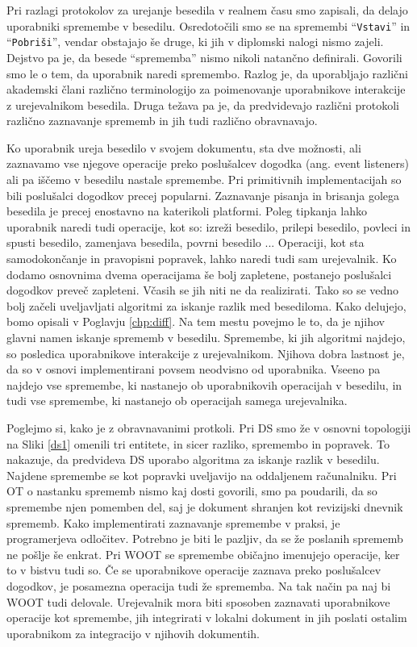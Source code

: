 \documentclass[a4paper, 12pt, twoside]{book}
\begin{document}
Pri razlagi protokolov za urejanje besedila v realnem času smo zapisali, da delajo uporabniki spremembe v besedilu. Osredotočili smo se na spremembi “{\tt Vstavi}” in “{\tt Pobriši}”, vendar obstajajo še druge, ki jih v diplomski nalogi nismo zajeli. Dejstvo pa je, da besede “sprememba” nismo nikoli natančno definirali. Govorili smo le o tem, da uporabnik naredi spremembo. Razlog je, da uporabljajo različni akademski člani različno terminologijo za poimenovanje uporabnikove interakcije z urejevalnikom besedila. Druga težava pa je, da predvidevajo različni protokoli različno zaznavanje sprememb in jih tudi različno obravnavajo.

Ko uporabnik ureja besedilo v svojem dokumentu, sta dve možnosti, ali zaznavamo vse njegove operacije preko poslušalcev dogodka (ang. event listeners) ali pa iščemo v besedilu nastale spremembe. Pri primitivnih implementacijah so bili poslušalci dogodkov precej popularni. Zaznavanje pisanja in brisanja golega besedila je precej enostavno na katerikoli platformi. Poleg tipkanja lahko uporabnik naredi tudi operacije, kot so: izreži besedilo, prilepi besedilo, povleci in spusti besedilo, zamenjava besedila, povrni besedilo ... Operaciji, kot sta samodokončanje in pravopisni popravek, lahko naredi tudi sam urejevalnik. Ko dodamo osnovnima dvema operacijama še bolj zapletene, postanejo poslušalci dogodkov preveč zapleteni. Včasih se jih niti ne da realizirati. Tako so se vedno bolj začeli uveljavljati algoritmi za iskanje razlik med besediloma. Kako delujejo, bomo opisali v Poglavju \ref{chp:diff}. Na tem mestu povejmo le to, da je njihov glavni namen iskanje sprememb v besedilu. Spremembe, ki jih algoritmi najdejo, so posledica uporabnikove interakcije z urejevalnikom. Njihova dobra lastnost je, da so v osnovi implementirani povsem neodvisno od uporabnika. Vseeno pa najdejo vse spremembe, ki nastanejo ob uporabnikovih operacijah v besedilu, in tudi vse spremembe, ki nastanejo ob operacijah samega urejevalnika.

Poglejmo si, kako je z obravnavanimi protkoli. Pri DS smo že v osnovni topologiji na Sliki \ref{ds1} omenili tri entitete, in sicer razliko, spremembo in popravek. To nakazuje, da predvideva DS uporabo algoritma za iskanje razlik v besedilu. Najdene spremembe se kot popravki uveljavijo na oddaljenem računalniku. Pri OT o nastanku sprememb nismo kaj dosti govorili, smo pa poudarili, da so spremembe njen pomemben del, saj je dokument shranjen kot revizijski dnevnik sprememb. Kako implementirati zaznavanje spremembe v praksi, je programerjeva odločitev. Potrebno je biti le pazljiv, da se že poslanih sprememb ne pošlje še enkrat. Pri WOOT se spremembe običajno imenujejo operacije, ker to v bistvu tudi so. Če se uporabnikove operacije zaznava preko poslušalcev dogodkov, je posamezna operacija tudi že sprememba. Na tak način pa naj bi WOOT tudi delovale. Urejevalnik mora biti sposoben zaznavati uporabnikove operacije kot spremembe, jih integrirati v lokalni dokument in jih poslati ostalim uporabnikom za integracijo v njihovih dokumentih.
\end{document}
